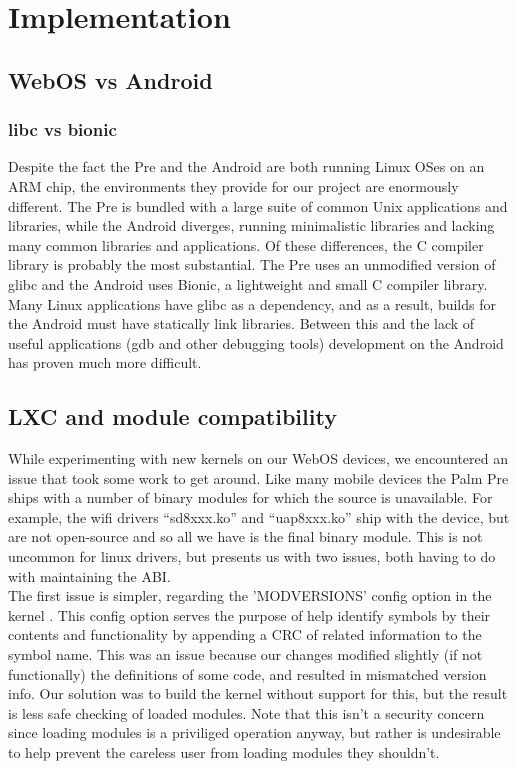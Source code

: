 \section{Implementation}
\label{sec:impl}

\subsection{WebOS vs Android}
\subsubsection{libc vs bionic}
Despite the fact the Pre and the Android are both running Linux OSes on an ARM chip, the environments they provide for our project are enormously different.  The Pre is bundled with a large suite of common Unix applications and libraries, while the Android diverges, running minimalistic libraries and lacking many common libraries and applications.  Of these differences, the C compiler library is probably the most substantial. The Pre uses an unmodified version of glibc and the Android uses Bionic, a lightweight and small C compiler library.  Many Linux applications have glibc as a dependency, and as a result, builds for the Android must have statically link libraries.  Between this and the lack of useful applications (gdb and other debugging tools) development on the Android has proven much more difficult.  

\subsection{LXC and module compatibility}

While experimenting with new kernels on our WebOS devices, we encountered an issue that took some work to get around.  Like many mobile devices the Palm Pre ships with a number of binary modules for which the source is unavailable.  For example, the wifi drivers ``sd8xxx.ko'' and ``uap8xxx.ko'' ship with the device, but are not open-source and so all we have is the final binary module.  This is not uncommon for linux drivers, but presents us with two issues, both having to do with maintaining the ABI. \\

    The first issue is simpler, regarding the 'MODVERSIONS' config option in the kernel .  This config option serves the purpose of help identify symbols by their contents and functionality by appending a CRC of related information to the symbol name.  This was an issue because our changes modified slightly (if not functionally) the definitions of some code, and resulted in mismatched version info.  Our solution was to build the kernel without support for this, but the result is less safe checking of loaded modules.  Note that this isn't a security concern since loading modules is a priviliged operation anyway, but rather is undesirable to help prevent the careless user from loading modules they shouldn't. \\

